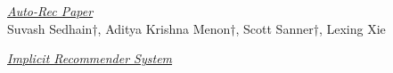 \documentclass[conference]{IEEEtran}
\begin{document}

%
%
%
\begin{thebibliography}{1}

\href{http://users.cecs.anu.edu.au/~akmenon/papers/autorec/autorec-paper.pdf}{\emph{Auto-Rec Paper}}\\
Suvash Sedhain†, Aditya Krishna Menon†, Scott Sanner†, Lexing Xie 

\href{http://activisiongamescience.github.io/2016/01/11/Implicit-Recommender-Systems-Biased-Matrix-Factorization/#Implicit-Feedback}{\emph{Implicit Recommender System}}
\end{thebibliography}

\end{document}
